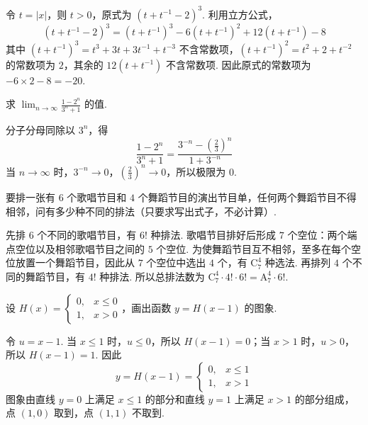 \begin{solution}
令 \(t=|x|\)，则 \(t>0\)，原式为 \((t+t^{-1}-2)^3\). 利用立方公式，
\[
(t+t^{-1}-2)^3=(t+t^{-1})^3-6(t+t^{-1})^2+12(t+t^{-1})-8
\]
其中 \((t+t^{-1})^3=t^3+3t+3t^{-1}+t^{-3}\) 不含常数项，\((t+t^{-1})^2=t^2+2+t^{-2}\) 的常数项为 \(2\)，其余的 \(12(t+t^{-1})\) 不含常数项. 因此原式的常数项为 \(-6\times2-8=-20\).
\end{solution}

\begin{problem}

求 \(\displaystyle\lim_{n\to \infty}\frac{1 - 2^n}{3^n + 1}\) 的值.
\end{problem}

\begin{solution}
分子分母同除以 \(3^n\)，得
\[
\frac{1-2^n}{3^n+1}=\frac{3^{-n}-\left(\frac{2}{3}\right)^n}{1+3^{-n}}
\]
当 \(n\to\infty\) 时，\(3^{-n}\to0\)，\(\left(\frac23\right)^n\to0\)，所以极限为 \(0\).
\end{solution}

\begin{problem}

要排一张有 \(6\) 个歌唱节目和 \(4\) 个舞蹈节目的演出节目单，任何两个舞蹈节目不得相邻，问有多少种不同的排法（只要求写出式子，不必计算）.
\end{problem}

\begin{solution}
先排 \(6\) 个不同的歌唱节目，有 \(6!\) 种排法. 歌唱节目排好后形成 \(7\) 个空位：两个端点空位以及相邻歌唱节目之间的 \(5\) 个空位. 为使舞蹈节目互不相邻，至多在每个空位放置一个舞蹈节目，因此从 \(7\) 个空位中选出 \(4\) 个，有 \(\mathrm C_7^4\) 种选法. 再排列 \(4\) 个不同的舞蹈节目，有 \(4!\) 种排法. 所以总排法数为 \(\mathrm C_7^4\cdot4!\cdot6!=\mathrm A_7^4\cdot6!\).
\end{solution}

\begin{problem}

设 \(H(x) = \begin{cases}
0, & x \leqslant 0\\
1, & x > 0
\end{cases}\)，画出函数 \(y = H(x - 1)\) 的图象.
\end{problem}

\begin{solution}
令 \(u=x-1\). 当 \(x\leqslant1\) 时，\(u\leqslant0\)，所以 \(H(x-1)=0\)；当 \(x>1\) 时，\(u>0\)，所以 \(H(x-1)=1\). 因此
\[
y=H(x-1)=\begin{cases}
0,&x\leqslant1\\
1,&x>1
\end{cases}
\]
图象由直线 \(y=0\) 上满足 \(x\leqslant1\) 的部分和直线 \(y=1\) 上满足 \(x>1\) 的部分组成，点 \((1,0)\) 取到，点 \((1,1)\) 不取到.
\end{solution}

